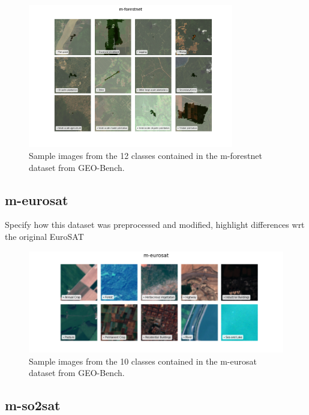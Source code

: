 \documentclass[a4paper, oneside, english]{sapthesis}
\begin{document}
\begin{figure}[h]
    \centering
    \includegraphics[width=0.8\textwidth]{img/m-forestnet_image_grid.png}
    \caption{Sample images from the 12 classes contained in the m-forestnet dataset from GEO-Bench.}
    \label{fig:forestnetgrid}
\end{figure}


\subsection{m-eurosat}

Specify how this dataset was preprocessed and modified, highlight differences wrt the original EuroSAT


\begin{figure}[h]
    \centering
    \includegraphics[width=\textwidth]{img/m-eurosat_image_grid.png}
    \caption{Sample images from the 10 classes contained in the m-eurosat dataset from GEO-Bench.}
    \label{fig:meurosatgrid}
\end{figure}


\subsection{m-so2sat}
\end{document}
